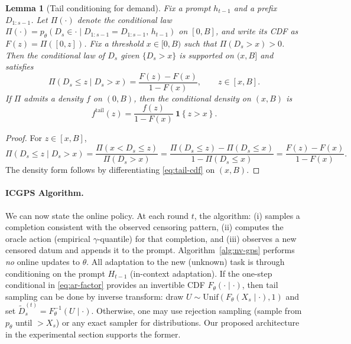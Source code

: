 \documentclass[11pt]{article}
\DeclarePairedDelimiter{\ind}{\mathbf{1}\{}{\}}
\newtheorem{lemma}{Lemma}
\providecommand{\ind}[1]{\mathbf{1}\!\left\{#1\right\}}
\begin{document}
\begin{lemma}[Tail conditioning for  demand]
\label{lem:tail-conditioning}
Fix a prompt $h_{t-1}$ and a prefix $D_{1:s-1}$.
Let $\Pi(\cdot)$ denote the conditional law
\(
\Pi(\cdot) = p_\theta(D_s\in\cdot\mid D_{1:s-1}=D_{1:s-1},\,h_{t-1})
\)
on $[0,B]$, and write its CDF as $F(z)=\Pi([0,z])$.
Fix a threshold $x\in[0,B)$ such that $\Pi(D_s>x)>0$.
Then the conditional law of $D_s$ given $\{D_s>x\}$ is supported on $(x,B]$ and satisfies
\begin{equation}
\label{eq:tail-cdf}
\Pi(D_s\le z \mid D_s>x)
=
\frac{F(z)-F(x)}{1-F(x)},
\qquad z\in[x,B].
\end{equation}
If $\Pi$ admits a density $f$ on $(0,B)$, then the conditional density on $(x,B)$ is
\begin{equation}
\label{eq:tail-density}
f^{\mathrm{tail}}(z)
=
\frac{f(z)}{1-F(x)}\ \ind{z>x}.
\end{equation}
\end{lemma}

\begin{proof}
For $z\in[x,B]$,
\[
\Pi(D_s\le z \mid D_s>x)
=
\frac{\Pi(x<D_s\le z)}{\Pi(D_s>x)}
=
\frac{\Pi(D_s\le z)-\Pi(D_s\le x)}{1-\Pi(D_s\le x)}
=
\frac{F(z)-F(x)}{1-F(x)}.
\]
The density form follows by differentiating \eqref{eq:tail-cdf} on $(x,B)$.
\end{proof}


\paragraph{ICGPS Algorithm.} We can now state the online policy. At each round $t$, the algorithm: (i) samples a completion consistent with the observed censoring pattern, (ii) computes the oracle action (empirical $\gamma$-quantile) for that completion, and (iii) observes a new censored datum and appends it to the prompt. Algorithm~\ref{alg:nv-gps} performs \emph{no} online updates to $\theta$. All adaptation to the new (unknown) task is through conditioning on the prompt $H_{t-1}$ (in-context adaptation). If the one-step conditional in \eqref{eq:ar-factor} provides an invertible CDF $F_\theta(\cdot\mid \cdot)$, then tail sampling can be done by inverse transform: draw $U\sim \mathrm{Unif}(F_\theta(X_s\mid \cdot),1)$ and set $\widetilde{D}_s^{(t)} = F_\theta^{-1}(U\mid \cdot)$. Otherwise, one may use rejection sampling (sample from $p_\theta$ until $>X_s$) or any exact sampler for distributions. Our proposed architecture in the experimental section supports the former.
\end{document}
